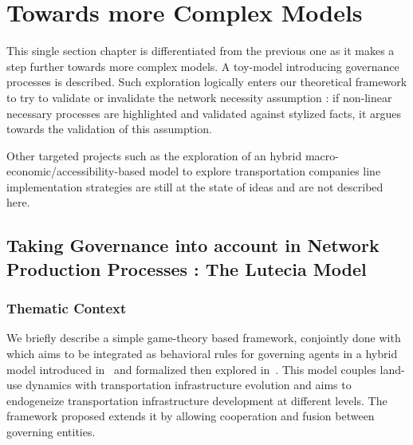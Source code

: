 




\chapter{Towards more Complex Models} %

\label{ch:complexmodels} %



This single section chapter is differentiated from the previous one as it makes a step further towards more complex models. A toy-model introducing governance processes is described. Such exploration logically enters our theoretical framework to try to validate or invalidate the network necessity assumption : if non-linear necessary processes are highlighted and validated against stylized facts, it argues towards the validation of this assumption. 

Other targeted projects such as the exploration of an hybrid macro-economic/accessibility-based model to explore transportation companies line implementation strategies are still at the state of ideas and are not described here.





\section[The Lutecia Model]{Taking Governance into account in Network Production Processes : The Lutecia Model}


\subsection{Thematic Context}


We briefly describe a simple game-theory based framework, conjointly done with  which aims to be integrated as behavioral rules for governing agents in a hybrid model introduced in~\cite{le2010approche} and formalized then explored in~\cite{lenechet2012}. This model couples land-use dynamics with transportation infrastructure evolution and aims to endogeneize transportation infrastructure development at different levels. The framework proposed extends it by allowing cooperation and fusion between governing entities.



